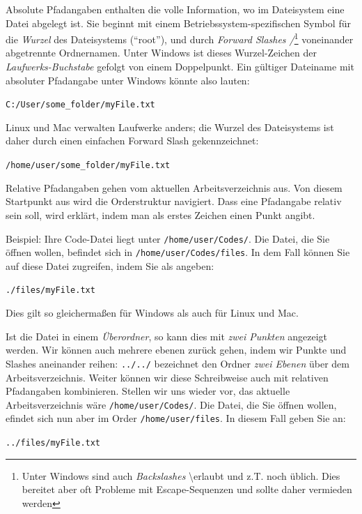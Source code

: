 Absolute Pfadangaben enthalten die volle Information, wo im Dateisystem eine Datei abgelegt ist. Sie beginnt mit einem Betriebssystem-spezifischen Symbol für die \emph{Wurzel} des Dateisystems (\enquote{root}), und durch \emph{Forward Slashes /}\footnote{Unter Windows sind auch \emph{Backslashes} \textbackslash erlaubt und z.\;T. noch üblich. Dies bereitet aber oft Probleme mit Escape-Sequenzen und sollte daher vermieden werden} voneinander abgetrennte Ordnernamen. Unter Windows ist dieses Wurzel-Zeichen der \emph{Laufwerks-Buchstabe} gefolgt von einem Doppelpunkt. Ein gültiger Dateiname mit absoluter Pfadangabe unter Windows könnte also lauten:
\begin{center}
	\texttt{C:/User/some\_folder/myFile.txt}
\end{center}
Linux und Mac verwalten Laufwerke anders; die Wurzel des Dateisystems ist daher durch einen einfachen Forward Slash gekennzeichnet:
\begin{center}
	\texttt{/home/user/some\_folder/myFile.txt}
\end{center}

Relative Pfadangaben gehen vom aktuellen Arbeitsverzeichnis aus. Von diesem Startpunkt aus wird die Orderstruktur navigiert. Dass eine Pfadangabe relativ sein soll, wird erklärt, indem man als erstes Zeichen einen Punkt angibt.

Beispiel: Ihre Code-Datei liegt unter \texttt{/home/user/Codes/}. Die Datei, die Sie öffnen wollen, befindet sich in \texttt{/home/user/Codes/files}. In dem Fall können Sie auf diese Datei zugreifen, indem Sie als  angeben:
\begin{center}
	\texttt{./files/myFile.txt}
\end{center}
Dies gilt so gleichermaßen für Windows als auch für Linux und Mac.

Ist die Datei in einem \emph{Überordner}, so kann dies mit \emph{zwei Punkten} angezeigt werden. Wir können auch mehrere ebenen zurück gehen, indem wir Punkte und Slashes aneinander reihen: \texttt{../../} bezeichnet den Ordner \emph{zwei Ebenen} über dem Arbeitsverzeichnis. Weiter können wir diese Schreibweise auch mit relativen Pfadangaben kombinieren. Stellen wir uns wieder vor, das aktuelle Arbeitsverzeichnis wäre \texttt{/home/user/Codes/}. Die Datei, die Sie öffnen wollen, efindet sich nun aber im Order \texttt{/home/user/files}. In diesem Fall geben Sie an:
\begin{center}
	\texttt{../files/myFile.txt}
\end{center}



